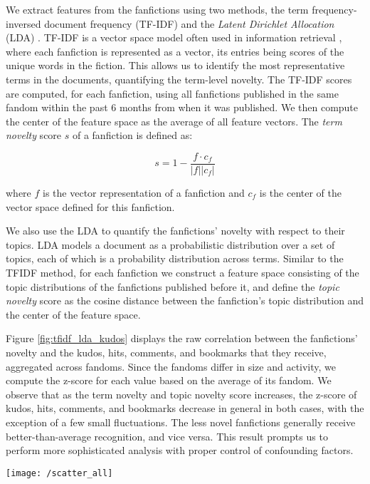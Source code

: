 \documentclass[letterpaper]{article} %
\begin{document}
We extract features from the fanfictions using two methods, the term frequency-inversed document frequency (TF-IDF) and the \emph{Latent Dirichlet Allocation} (LDA) \cite{blei2003latent}. TF-IDF is a vector space model often used in information retrieval \cite{turney2010frequency}, where each fanfiction is represented as a vector, its entries being scores of the unique words in the fiction. This allows us to identify the most representative terms in the documents, quantifying the term-level novelty. The TF-IDF scores are computed, for each fanfiction, using all fanfictions published in the same fandom within the past 6 months from when it was published. We then compute the center of the feature space as the average of all feature vectors. The \emph{term novelty} score $s$ of a fanfiction is defined as:

\begin{equation}
s = 1-\frac{f\cdot{c_f}}{\lvert f \rvert \lvert c_f \rvert}
\end{equation}

where $f$ is the vector representation of a fanfiction and $c_f$ is the center of the vector space defined for this fanfiction.

We also use the LDA to quantify the fanfictions' novelty with respect to their topics. LDA models a document as a probabilistic distribution over a set of topics, each of which is a probability distribution across terms. Similar to the TFIDF method, for each fanfiction we construct a feature space consisting of the topic distributions of the fanfictions published before it, and define the \emph{topic novelty} score as the cosine distance between the fanfiction's topic distribution and the center of the feature space. 

Figure \ref{fig:tfidf_lda_kudos} displays the raw correlation between the fanfictions' novelty and the kudos, hits, comments, and bookmarks that they receive, aggregated across fandoms. Since the fandoms differ in size and activity, we compute the z-score for each value based on the average of its fandom. We observe that as the term novelty and topic novelty score increases, the z-score of kudos, hits, comments, and bookmarks decrease in general in both cases, with the exception of a few small fluctuations. The less novel fanfictions generally receive better-than-average recognition, and vice versa. This result prompts us to perform more sophisticated analysis with proper control of confounding factors.

\begin{figure*}
    \centering
          \texttt{[image: /scatter\_all]}
        \caption{The relationships between novelty and success, measured by kudos, hits, comments, and bookmarks. The horizontal axes are the novelty scores, and the vertical axes are the corresponding average of the z-score of kudos, hits, comments, and bookmarks in bins with bin size = 0.1. The confidence intervals obtained from bootstrap resampling are shown. }
        \label{fig:tfidf_lda_kudos}
\end{figure*}
\end{document}
